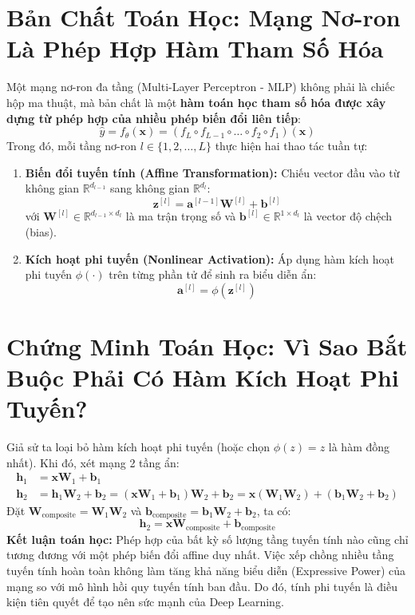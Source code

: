 \documentclass[12pt,a4paper]{report}
\begin{document}
\section{Bản Chất Toán Học: Mạng Nơ-ron Là Phép Hợp Hàm Tham Số Hóa}
Một mạng nơ-ron đa tầng (Multi-Layer Perceptron - MLP) không phải là chiếc hộp ma thuật, mà bản chất là một \textbf{hàm toán học tham số hóa được xây dựng từ phép hợp của nhiều phép biến đổi liên tiếp}:
\begin{equation}
    \hat{y} = f_\theta(\mathbf{x}) = \left( f_L \circ f_{L-1} \circ \dots \circ f_2 \circ f_1 \right)(\mathbf{x})
\end{equation}
Trong đó, mỗi tầng nơ-ron $l \in \{1, 2, \dots, L\}$ thực hiện hai thao tác tuần tự:
\begin{enumerate}
    \item \textbf{Biến đổi tuyến tính (Affine Transformation):} Chiếu vector đầu vào từ không gian $\mathbb{R}^{d_{l-1}}$ sang không gian $\mathbb{R}^{d_l}$:
    \begin{equation}
        \mathbf{z}^{[l]} = \mathbf{a}^{[l-1]} \mathbf{W}^{[l]} + \mathbf{b}^{[l]}
    \end{equation}
    với $\mathbf{W}^{[l]} \in \mathbb{R}^{d_{l-1} \times d_l}$ là ma trận trọng số và $\mathbf{b}^{[l]} \in \mathbb{R}^{1 \times d_l}$ là vector độ chệch (bias).
    \item \textbf{Kích hoạt phi tuyến (Nonlinear Activation):} Áp dụng hàm kích hoạt phi tuyến $\phi(\cdot)$ trên từng phần tử để sinh ra biểu diễn ẩn:
    \begin{equation}
        \mathbf{a}^{[l]} = \phi(\mathbf{z}^{[l]})
    \end{equation}
\end{enumerate}

\section{Chứng Minh Toán Học: Vì Sao Bắt Buộc Phải Có Hàm Kích Hoạt Phi Tuyến?}
Giả sử ta loại bỏ hàm kích hoạt phi tuyến (hoặc chọn $\phi(z) = z$ là hàm đồng nhất). Khi đó, xét mạng 2 tầng ẩn:
\begin{align}
    \mathbf{h}_1 &= \mathbf{x} \mathbf{W}_1 + \mathbf{b}_1 \\
    \mathbf{h}_2 &= \mathbf{h}_1 \mathbf{W}_2 + \mathbf{b}_2 = (\mathbf{x} \mathbf{W}_1 + \mathbf{b}_1)\mathbf{W}_2 + \mathbf{b}_2 = \mathbf{x} (\mathbf{W}_1 \mathbf{W}_2) + (\mathbf{b}_1 \mathbf{W}_2 + \mathbf{b}_2)
\end{align}
Đặt $\mathbf{W}_{\text{composite}} = \mathbf{W}_1 \mathbf{W}_2$ và $\mathbf{b}_{\text{composite}} = \mathbf{b}_1 \mathbf{W}_2 + \mathbf{b}_2$, ta có:
\begin{equation}
    \mathbf{h}_2 = \mathbf{x} \mathbf{W}_{\text{composite}} + \mathbf{b}_{\text{composite}}
\end{equation}
\textbf{Kết luận toán học:} Phép hợp của bất kỳ số lượng tầng tuyến tính nào cũng chỉ tương đương với một phép biến đổi affine duy nhất. Việc xếp chồng nhiều tầng tuyến tính hoàn toàn không làm tăng khả năng biểu diễn (Expressive Power) của mạng so với mô hình hồi quy tuyến tính ban đầu. Do đó, tính phi tuyến là điều kiện tiên quyết để tạo nên sức mạnh của Deep Learning.
\end{document}
